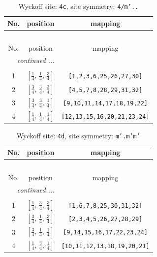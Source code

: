 \documentclass[fleqn,8pt]{jsarticle}
\begin{document}
\renewcommand{\arraystretch}{1.2}
\begin{longtable}{ccc}
\caption{Wyckoff site: {\tt 4c}, site symmetry: {\tt 4/m'..}}
 \\
 \hline \hline
No. & position & mapping \\ \hline \endfirsthead

\multicolumn{2}{l}{\tablename\ \thetable{}} \\
 \hline \hline
No. & position & mapping \\ \hline \endhead

 \hline \hline
\multicolumn{2}{r}{\footnotesize\it continued ...} \\ \endfoot

 \hline \hline
\multicolumn{2}{r}{} \\ \endlastfoot

1 & $\left[ \frac{1}{4},\, \frac{1}{4},\, \frac{3}{4} \right]$ & {\tt [1,2,3,6,25,26,27,30]} \\ \hline
2 & $\left[ \frac{3}{4},\, \frac{3}{4},\, \frac{3}{4} \right]$ & {\tt [4,5,7,8,28,29,31,32]} \\ \hline
3 & $\left[ \frac{3}{4},\, \frac{3}{4},\, \frac{1}{4} \right]$ & {\tt [9,10,11,14,17,18,19,22]} \\ \hline
4 & $\left[ \frac{1}{4},\, \frac{1}{4},\, \frac{1}{4} \right]$ & {\tt [12,13,15,16,20,21,23,24]} \\
\end{longtable}
\renewcommand{\arraystretch}{1.2}
\begin{longtable}{ccc}
\caption{Wyckoff site: {\tt 4d}, site symmetry: {\tt m'.m'm'}}
 \\
 \hline \hline
No. & position & mapping \\ \hline \endfirsthead

\multicolumn{2}{l}{\tablename\ \thetable{}} \\
 \hline \hline
No. & position & mapping \\ \hline \endhead

 \hline \hline
\multicolumn{2}{r}{\footnotesize\it continued ...} \\ \endfoot

 \hline \hline
\multicolumn{2}{r}{} \\ \endlastfoot

1 & $\left[ \frac{1}{4},\, \frac{3}{4},\, \frac{3}{4} \right]$ & {\tt [1,6,7,8,25,30,31,32]} \\ \hline
2 & $\left[ \frac{3}{4},\, \frac{1}{4},\, \frac{3}{4} \right]$ & {\tt [2,3,4,5,26,27,28,29]} \\ \hline
3 & $\left[ \frac{3}{4},\, \frac{1}{4},\, \frac{1}{4} \right]$ & {\tt [9,14,15,16,17,22,23,24]} \\ \hline
4 & $\left[ \frac{1}{4},\, \frac{3}{4},\, \frac{1}{4} \right]$ & {\tt [10,11,12,13,18,19,20,21]} \\
\end{longtable}
\end{document}
